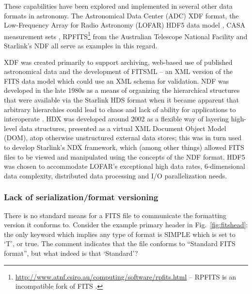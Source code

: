 \documentclass[final,authoryear,5p,times,twocolumn]{elsarticle}
\begin{document}
{{These capabilities have been explored and implemented in several other data formats in astronomy.
The Astronomical Data Center (ADC) XDF
format, the Low-Frequency Array for Radio Astronomy (LOFAR) HDF5 data
model \citep{2012ASPC..461..283A}, CASA measurement sets
\citep{2012ASPC..461..849P},
RPFITS\footnote{\url{http://www.atnf.csiro.au/computing/software/rpfits.html}
-- RPFITS is an incompatible fork of FITS \citep[see e.g.,][]{1998ASPC..145...32B}.} from the Australian Telescope
National Facility
and Starlink's NDF
\citep{1988STARB...2...11C,1993ASPC...52..229W,P91_adassxxiii} all
serve as examples in this regard.

XDF \citep{2001ASPC..238..217S} was created primarily to support archiving, web-based use of
published astronomical data and the development of FITSML -- an XML version
of the FITS data model which could use an XML schema for validation.
NDF was developed in the late
1980s as a means of organizing the hierarchical structures that were
available via the Starlink HDS format when it became apparent that
arbitrary hierarchies could lead to chaos and lack of ability for
applications to interoperate \citep{2014Jenness}.
HDX \citep{2003ASPC..295..221G} was developed around 2002 as a flexible
way of layering high-level data structures, presented as a virtual XML
Document Object Model (DOM), atop otherwise unstructured external data stores; this was in
turn used to develop Starlink's NDX framework, which (among other
things) allowed FITS files to be viewed and manipulated using the
concepts of the NDF format.
HDF5 \citep{2012ASPC..461..283A} was chosen to accommodate LOFAR's
exceptional high data rates, 6-dimensional data complexity, distributed
data processing and I/O parallelization needs.



\subsubsection{Lack of serialization/format versioning}
\label{lack_of_serialization}

There is no standard means for a FITS file to communicate
the formatting version it conforms to.  Consider the example primary
header in Fig.~\ref{fig:fitshead}: the only keyword which implies any
type of format is SIMPLE which is set to `T', or true. The comment
indicates that the file conforms to ``Standard FITS format'', but what
indeed is that `Standard'?


}}
\end{document}
